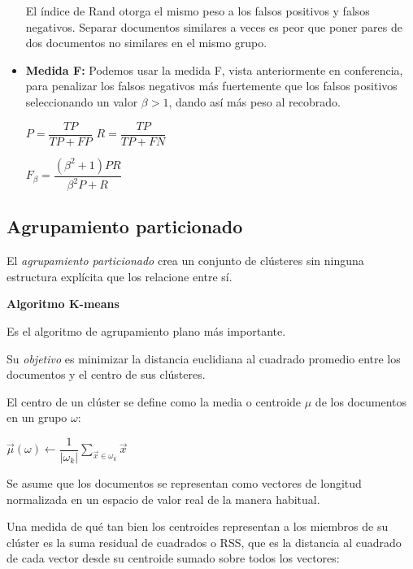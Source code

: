 \documentclass{llncs}
\begin{document}
\begin{itemize}
	El índice de Rand otorga el mismo peso a los falsos positivos y falsos negativos. Separar documentos similares a veces es peor que poner pares de dos documentos no similares en el mismo grupo.
	
	\vspace{1em}
	\item \textbf{Medida F:} Podemos usar la medida F, vista anteriormente en conferencia, para penalizar los falsos negativos más fuertemente que los falsos positivos seleccionando un valor $ \beta > 1 $, dando así más peso al recobrado.
	\begin{center}
		$ P = \dfrac{TP}{TP + FP}  $ \hspace{2em}
		$ R = \dfrac{TP}{TP + FN} $
		
		\vspace{1em}
		$ F_{\beta} = \dfrac{(\beta^{2} + 1)PR}{\beta^{2}P + R} $
	\end{center}
\end{itemize}

\subsection{Agrupamiento particionado}

El \textit{agrupamiento particionado} crea un conjunto  de clústeres sin ninguna estructura explícita que los relacione entre sí. 

\vspace{1em}
\textbf{Algoritmo K-means}
\vspace{0.5em}

	Es el algoritmo de agrupamiento plano más importante. 
	
	Su \textit{objetivo} es minimizar la distancia euclidiana al cuadrado promedio entre los documentos y el centro de sus cl\'usteres. 
	
	El centro de un cl\'uster se define como la media o centroide $\mu$ de los documentos en un grupo $\omega$:
	
	\begin{center}
		$ \overrightarrow{\mu}(\omega) \leftarrow \dfrac{1}{|\omega_{k}|} \sum_{\overrightarrow{x} \in \omega_{k}} \overrightarrow{x} $
	\end{center}
	
	Se asume que los documentos se representan como vectores de longitud normalizada  en un espacio de valor real de la manera habitual.  
	
	Una medida de qué tan bien los centroides representan a los miembros de su cl\'uster es la suma residual de cuadrados o RSS, que es la distancia al cuadrado de cada vector desde su centroide sumado sobre todos los vectores:
	
\end{document}
